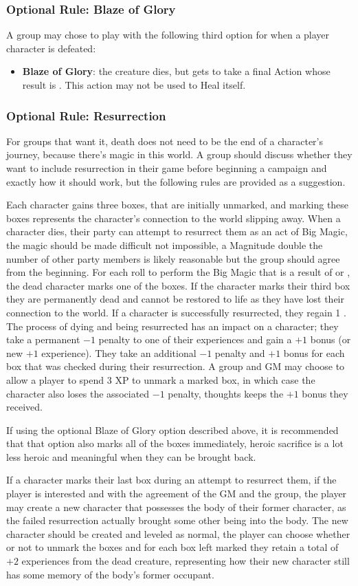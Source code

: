 \subsubsection{Optional Rule: Blaze of Glory}
A group may chose to play with the following third option for when a player character is defeated:
\begin{itemize}
  \item[-] \textbf{Blaze of Glory}: the creature dies, but gets to take a final Action whose result is \VeryGood.
    This action may not be used to Heal itself.
\end{itemize}

\subsubsection{Optional Rule: Resurrection}
For groups that want it, death does not need to be the end of a character's journey, because there's magic in this world.
A group should discuss whether they want to include resurrection in their game before beginning a campaign and exactly how it should work, but the following rules are provided as a suggestion.

Each character gains three boxes, that are initially unmarked, and marking these boxes represents the character's connection to the world slipping away.
When a character dies, their party can attempt to resurrect them as an act of Big Magic, the magic should be made difficult not impossible, a Magnitude double the number of other party members is likely reasonable but the group should agree from the beginning.
For each roll to perform the Big Magic that is a result of \Bad{} or \VeryBad{}, the dead character marks one of the boxes.
If the character marks their third box they are permanently dead and cannot be restored to life as they have lost their connection to the world.
If a character is successfully resurrected, they regain 1 \Life{}.
The process of dying and being resurrected has an impact on a character; they take a permanent $-1$ penalty to one of their experiences and gain a $+1$ bonus (or new $+ 1$ experience).
They take an additional $-1$ penalty and $+1$ bonus for each box that was checked during their resurrection.
A group and GM may choose to allow a player to spend 3 XP to unmark a marked box, in which case the character also loses the associated $-1$ penalty, thoughts keeps the $+1$ bonus they received.

If using the optional Blaze of Glory option described above, it is recommended that that option also marks all of the boxes immediately, heroic sacrifice is a lot less heroic and meaningful when they can be brought back.

If a character marks their last box during an attempt to resurrect them, if the player is interested and with the agreement of the GM and the group, the player may create a new character that possesses the body of their former character, as the failed resurrection actually brought some other being into the body.
The new character should be created and leveled as normal, the player can choose whether or not to unmark the boxes and for each box left marked they retain a total of $+ 2$ experiences from the dead creature, representing how their new character still has some memory of the body's former occupant.
